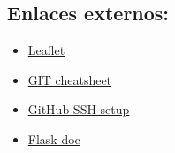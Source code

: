 \subsection{Enlaces externos:}

\begin{itemize}
    
\item \href{https://leafletjs.com/examples.html}{Leaflet}
\item \href{https://education.github.com/git-cheat-sheet-education.pdf}{GIT cheatsheet}
\item \href{https://docs.github.com/en/authentication/connecting-to-github-with-ssh}{GitHub SSH setup}
\item \href{https://flask.palletsprojects.com/en/3.0.x/}{Flask doc}
\end{itemize}
